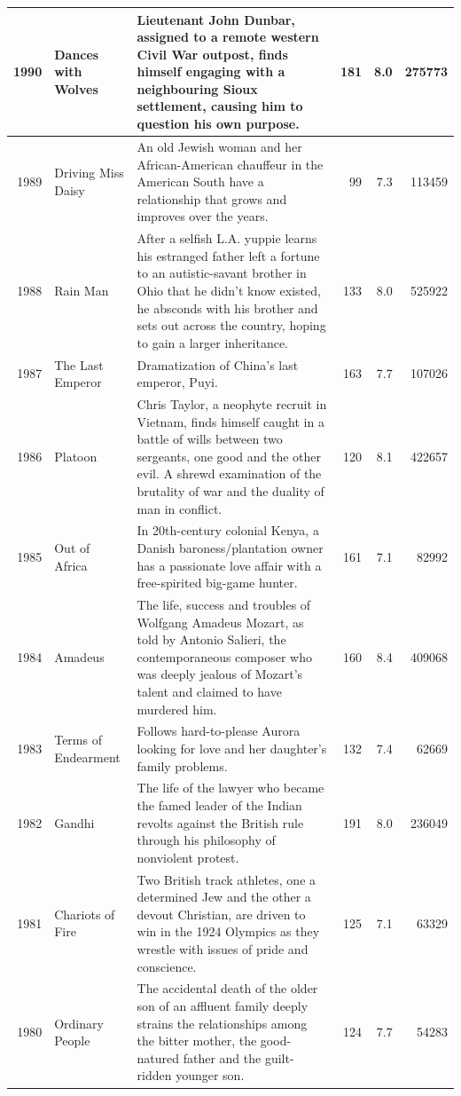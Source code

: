 \documentclass[
]{book}
\begin{document}
\begin{tabular}{r|l|l|r|r|r}
\hline
1990 & Dances with Wolves & Lieutenant John Dunbar, assigned to a remote western Civil War outpost, finds himself engaging with a neighbouring Sioux settlement, causing him to question his own purpose. & 181 & 8.0 & 275773\\
\hline
1989 & Driving Miss Daisy & An old Jewish woman and her African-American chauffeur in the American South have a relationship that grows and improves over the years. & 99 & 7.3 & 113459\\
\hline
1988 & Rain Man & After a selfish L.A. yuppie learns his estranged father left a fortune to an autistic-savant brother in Ohio that he didn't know existed, he absconds with his brother and sets out across the country, hoping to gain a larger inheritance. & 133 & 8.0 & 525922\\
\hline
1987 & The Last Emperor & Dramatization of China's last emperor, Puyi. & 163 & 7.7 & 107026\\
\hline
1986 & Platoon & Chris Taylor, a neophyte recruit in Vietnam, finds himself caught in a battle of wills between two sergeants, one good and the other evil. A shrewd examination of the brutality of war and the duality of man in conflict. & 120 & 8.1 & 422657\\
\hline
1985 & Out of Africa & In 20th-century colonial Kenya, a Danish baroness/plantation owner has a passionate love affair with a free-spirited big-game hunter. & 161 & 7.1 & 82992\\
\hline
1984 & Amadeus & The life, success and troubles of Wolfgang Amadeus Mozart, as told by Antonio Salieri, the contemporaneous composer who was deeply jealous of Mozart's talent and claimed to have murdered him. & 160 & 8.4 & 409068\\
\hline
1983 & Terms of Endearment & Follows hard-to-please Aurora looking for love and her daughter's family problems. & 132 & 7.4 & 62669\\
\hline
1982 & Gandhi & The life of the lawyer who became the famed leader of the Indian revolts against the British rule through his philosophy of nonviolent protest. & 191 & 8.0 & 236049\\
\hline
1981 & Chariots of Fire & Two British track athletes, one a determined Jew and the other a devout Christian, are driven to win in the 1924 Olympics as they wrestle with issues of pride and conscience. & 125 & 7.1 & 63329\\
\hline
1980 & Ordinary People & The accidental death of the older son of an affluent family deeply strains the relationships among the bitter mother, the good-natured father and the guilt-ridden younger son. & 124 & 7.7 & 54283\\

\end{tabular}
\end{document}
